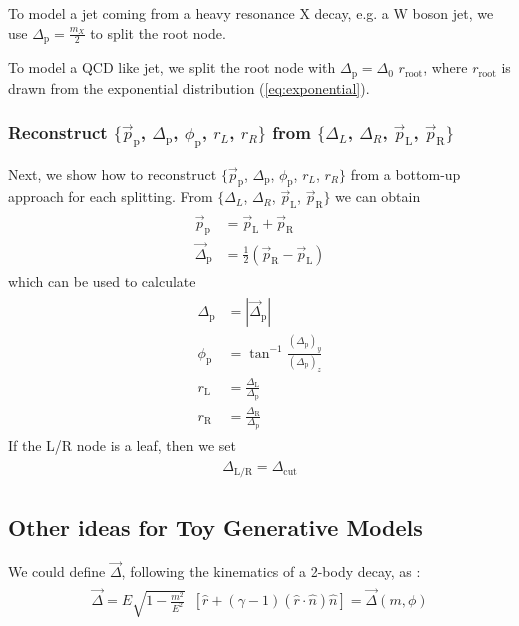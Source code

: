 \documentclass[12pt]{article}
\newcommand{\bea}{\begin{eqnarray}\begin{aligned}}
\newcommand{\eea}{\end{aligned}\end{eqnarray}}
\begin{document}
To model a jet coming from a heavy resonance X decay, e.g. a W boson jet, we use $\Delta_{\text{p}} =  \frac{m_X}{2}$ to split the root node.

To model a QCD like jet, we split the root node with $\Delta_{\text{p}} = \Delta_0 \,\, r_{\text{root}}$, where $r_{\text{root}}$ is drawn from the exponential distribution (\ref{eq:exponential}).

\subsubsection{Reconstruct $\{\vec{p}_\text{p}$, $\Delta_{\text{p}}$, $\phi_{\text{p}}$, $r_L$, $r_R\}$ from  $\{\Delta_L$, $\Delta_R$, $\vec{p}_\text{L}$, $ \vec{p}_\text{R}\}$ }

Next, we show how to reconstruct $\{\vec{p}_\text{p}$, $\Delta_{\text{p}}$, $\phi_{\text{p}}$, $r_L$, $r_R\}$ from a bottom-up approach for each splitting. From  $\{\Delta_L$, $\Delta_R$, $\vec{p}_\text{L}$, $ \vec{p}_\text{R}\}$ we can obtain
\bea
\vec{p}_\text{p} &= \vec{p}_\text{L}+ \vec{p}_\text{R}\\
\vec{\Delta}_\text{p} &= \frac{1}{2} (\vec{p}_\text{R} - \vec{p}_\text{L})
\eea
which can be used to calculate
\bea
\Delta_\text{p} &= | \vec{ \Delta}_\text{p} |\\
\phi_{\text{p}} &=\tan^{-1}\frac{(\Delta_\text{p})_y}{(\Delta_\text{p})_z}\\
r_{\text{L}} &=\frac{\Delta_{\text{L}}}{\Delta_{\text{p}}}\\
r_{\text{R}} &=\frac{\Delta_{\text{R}}}{\Delta_{\text{p}}}
\eea
If the L/R node is a leaf, then we set
\bea
\Delta_{\text{L/R}}=\Delta_{\text{cut}}
\eea






\subsection{Other ideas for Toy Generative Models}

We could define $\vec{\Delta}$, following the kinematics of a 2-body decay, as :
\bea
 \vec{\Delta}   = E \sqrt{1-\frac{m^2}{E^2}} \,\,\,[ \hat{r} + (\gamma -1) (\hat{r} \cdot \hat{n}) \hat{n} ] = \vec{\Delta}(m,\phi)
\eea
\end{document}
